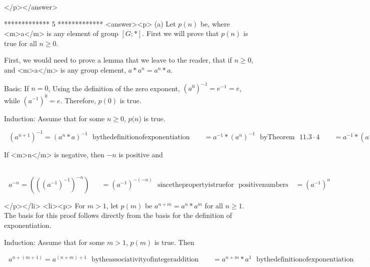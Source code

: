 </p></answer>


*************
5
*************
<answer><p> (a) Let \(p(n)\) be, where <m>a</m> is any element of group \([G; *]\). First we will prove that \(p(n)\) is true for all \(n \geq  0\).



First, we would need to prove a lemma that we leave to the reader, that if \(n\geq 0\), and <m>a</m> is any group element, \(a*a^n=a^n*a\). 



Basis: If \(n = 0\), Using the definition of the zero exponent,  \(\left(a ^0\right) ^{-1} = e^{-1} = e\),  while \(\left(a^{-1}\right)^0= e\).
Therefore, \(p(0)\) is true.



Induction: Assume that for some \(n \geq  0\), \(p(n\)) is true.



\(\text{               }\left(a^{n+1}\right)^{-1}= \left(a^n*a\right)^{-1}\text{   }\text{by} \text{the} \text{definition} \text{of} \text{exponentiation}\quad
\quad =a^{-1}*\left(a^n\right)^{-1}\text{     }\text{by} \text{Theorem}\text{  }11.3\cdot 4\quad \quad = a^{-1}*\left(a^{-1}\right)^n\text{   }\text{by}
\text{the} \text{induction} \text{hypothesis}\quad \quad = \left(a^{-1}\right)^{n+1} \text{by} \text{the} \text{lemma}\)



If <m>n</m> is negative, then \(-n\) is positive and



$\quad \quad $\(\text{   }a^{-n}= \left(\left(\left(a^{-1}\right)^{-1}\right)^{-n} \right)\text{  }\quad =\left(a^{-1}\right)^{-(-n)}\text{  }\text{since}
\text{the} \text{property} \text{is} \text{true} \text{for}\text{  }\text{positive} \text{numbers}\quad =\left(a^{-1}\right)^n\)

</p></li>
<li><p> For \(m > 1\), let \(p(m)\) be \(a^{n+m}=a^n*a^m\) for all \(n\geq 1\). The basis for this proof follows directly from the basis for the definition
of exponentiation.



Induction: Assume that for some \(m > 1\), \(p(m)\) is true. Then



\(\text{                }a^{n+(m+1)}= a^{(n+m)+1}\text{   }\text{by} \text{the} \text{associativity} \text{of} \text{integer} \text{addition}\quad
\quad =a^{n+m}*a^1\text{  }\text{by} \text{the} \text{definition} \text{of} \text{exponentiation}\quad \quad =\left(a^n*a^m\right)*a^1\text{  }\text{by}
\text{the} \text{induction} \text{hypothesis}\quad \quad = a^n*\left(a^m*a^1\right)\text{   }\text{by} \text{associativity}\quad \quad = a^n*a^{m+1}\text{
 }\text{by} \text{the} \text{definition} \text{of} \text{exponentiation}\)

